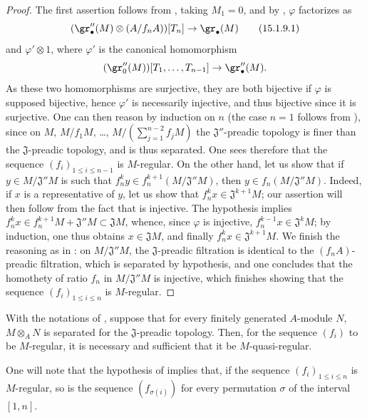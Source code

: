 \begin{proof}
The first assertion follows from , taking $M_1=0$, and by , $\varphi$ factorizes as
\[
\label{0.15.1.9.1}
  (\gr''_\bullet(M)\otimes(A/f_nA))[T_n] \to \gr_\bullet(M)
\tag{15.1.9.1}
\]
and $\varphi'\otimes 1$, where $\varphi'$ is the canonical homomorphism
\[
  (\gr''_0(M))[T_1,\ldots,T_{n-1}] \to \gr''_\bullet(M).
\]
As these two homomorphisms are surjective, they are both bijective if $\varphi$ is supposed bijective, hence $\varphi'$ is necessarily injective, and thus bijective since it is surjective.
One can then reason by induction on $n$ (the case $n=1$ follows from ), since on $M$, $M/f_1M$, \ldots, $M/(\sum_{j=1}^{n-2}f_jM)$ the $\mathfrak{J}''$-preadic topology is finer than the $\mathfrak{J}$-preadic topology, and is thus separated.
One sees therefore that the sequence $(f_i)_{1\leq i\leq n-1}$ is $M$-regular.
On the other hand, let us show that if $y\in M/\mathfrak{J}''M$ is such that $f_n^ky\in f_n^{k+1}(M/\mathfrak{J}''M)$, then $y\in f_n(M/\mathfrak{J}''M)$.
Indeed, if $x$ is a representative of $y$, let us show that $f_n^kx\in\mathfrak{J}^{k+1}M$;
our assertion will then follow from the fact that  is injective.
The hypothesis implies $f_n^kx\in f_n^{k+1}M+\mathfrak{J}''M\subset\mathfrak{J}M$, whence, since $\varphi$ is injective, $f_n^{k-1}x\in\mathfrak{J}^kM$;
by induction, one thus obtains $x\in\mathfrak{J}M$, and finally $f_n^kx\in\mathfrak{J}^{k+1}M$.
We finish the reasoning as in :
on $M/\mathfrak{J}''M$, the $\mathfrak{J}$-preadic filtration is identical to the $(f_nA)$-preadic filtration, which is separated by hypothesis, and one concludes that the homothety of ratio $f_n$ in $M/\mathfrak{J}''M$ is injective, which finishes showing that the sequence $(f_i)_{1\leq i\leq n}$ is $M$-regular.
\end{proof}

\begin{corollary}[15.1.10]
\label{0.15.1.10}
With the notations of , suppose that for every finitely generated $A$-module $N$, $M\otimes_AN$ is separated for the $\mathfrak{J}$-preadic topology.
Then, for the sequence $(f_i)$ to be $M$-regular, it is necessary and sufficient that it be $M$-quasi-regular.
\end{corollary}

One will note that the hypothesis of  implies that, if the sequence $(f_i)_{1\leq i\leq n}$ is $M$-regular, so is the sequence $(f_{\sigma(i)})$ for every permutation $\sigma$ of the interval $[1,n]$.


